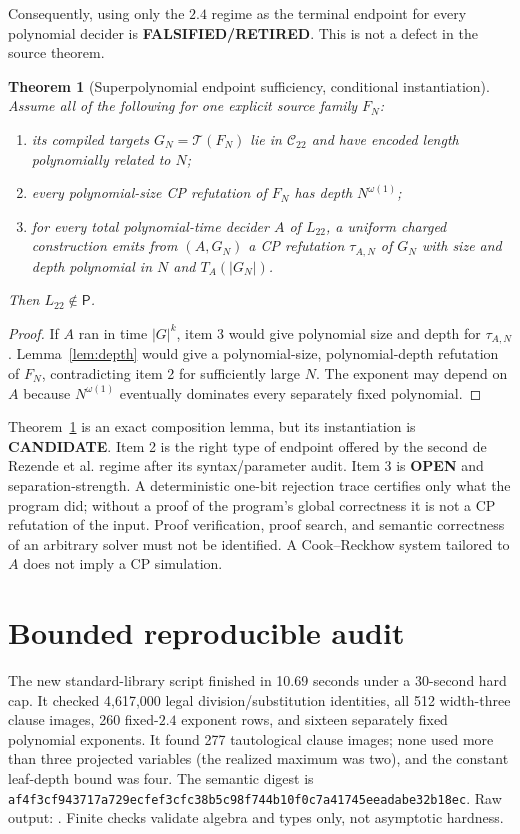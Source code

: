 \documentclass[11pt]{article}
\newtheorem{theorem}{Theorem}
\newcommand{\Ltwo}{L_{22}}
\newcommand{\OPEN}{\textbf{OPEN}}
\newcommand{\CAND}{\textbf{CANDIDATE}}
\newcommand{\RET}{\textbf{FALSIFIED/RETIRED}}
\begin{document}
Consequently, using only the $2.4$ regime as the terminal endpoint for every
polynomial decider is \RET.  This is not a defect in the source theorem.

\begin{theorem}[Superpolynomial endpoint sufficiency, conditional
instantiation]\label{thm:endpoint}
Assume all of the following for one explicit source family $F_N$:
\begin{enumerate}
\item its compiled targets $G_N=\mathcal T(F_N)$ lie in $\mathcal C_{22}$
and have encoded length polynomially related to $N$;
\item every polynomial-size CP refutation of $F_N$ has depth
$N^{\omega(1)}$;
\item for every total polynomial-time decider $A$ of $\Ltwo$, a uniform
charged construction emits from $(A,G_N)$ a CP refutation $\tau_{A,N}$ of
$G_N$ with size and depth polynomial in $N$ and $T_A(|G_N|)$.
\end{enumerate}
Then $\Ltwo\notin\mathsf P$.
\end{theorem}
\begin{proof}
If $A$ ran in time $|G|^k$, item 3 would give polynomial size and depth for
$\tau_{A,N}$.  Lemma~\ref{lem:depth} would give a polynomial-size,
polynomial-depth refutation of $F_N$, contradicting item 2 for sufficiently
large $N$.  The exponent may depend on $A$ because $N^{\omega(1)}$
eventually dominates every separately fixed polynomial.
\end{proof}

Theorem~\ref{thm:endpoint} is an exact composition lemma, but its
instantiation is \CAND.  Item 2 is the right type of endpoint offered by the
second de Rezende et al. regime after its syntax/parameter audit.  Item 3 is
\OPEN{} and separation-strength.  A deterministic one-bit rejection trace
certifies only what the program did; without a proof of the program's global
correctness it is not a CP refutation of the input.  Proof verification,
proof search, and semantic correctness of an arbitrary solver must not be
identified.  A Cook--Reckhow system tailored to $A$ does not imply a CP
simulation.

\section{Bounded reproducible audit}

The new standard-library script
 finished in
10.69 seconds under a 30-second hard cap.  It checked 4,617,000 legal
division/substitution identities, all 512 width-three clause images, 260
fixed-$2.4$ exponent rows, and sixteen separately fixed polynomial
exponents.  It found 277 tautological clause images; none used more than
three projected variables (the realized maximum was two), and the
constant leaf-depth bound was four.  The semantic digest is
\texttt{af4f3cf943717a729ecfef3cfc38b5c98f744b10f0c7a41745eeadabe32b18ec}.
Raw output:
.
Finite checks validate algebra and types only, not asymptotic hardness.
\end{document}
